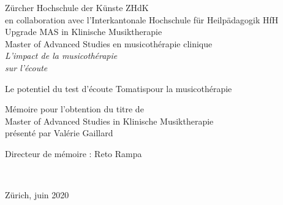 
\begin{titlepage}
 \begin{center}
    {\Large
     Zürcher Hochschule der Künste ZHdK\\
 	en collaboration avec l'Interkantonale Hochschule für
        Heilpädagogik HfH \\
	 Upgrade MAS in Klinische Musiktherapie \\ Master of Advanced Studies en musicothérapie clinique\\}
  \vfill
  {\Huge \emph{L'impact de la musicothérapie\\ sur l'écoute}} \medskip


{\LARGE Le potentiel du test d'écoute Tomatis\textsuperscript \textregistered  pour la musicothérapie} 
\vfill

{\Large Mémoire pour l'obtention du titre de\\ \medskip
Master of Advanced Studies in Klinische Musiktherapie \\ \smallskip 
présenté par Valérie Gaillard}

{\large Directeur de mémoire : Reto Rampa}



	 \hfill \\
	 \rule{0mm}{1pt} \hfill
{\large Zürich, juin 2020}
 \end{center}
\end{titlepage}
